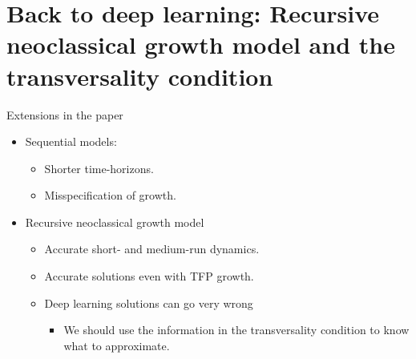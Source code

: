 \documentclass[aspectratio=169,10pt]{beamer}
\begin{document}
\section{\textcolor{PennBlue}{Back to deep learning: Recursive neoclassical growth model and the transversality condition }}

\begin{frame}{Extensions in the paper}
	\begin{itemize}
		\item Sequential models:
		\begin{itemize}
			\item Shorter time-horizons.
			\smallskip
			\item Misspecification of growth.\\
			\smallskip
		\end{itemize}
		\smallskip
		\item Recursive neoclassical growth model
		\begin{itemize}
			\item Accurate short- and medium-run dynamics.
			\smallskip
			\item Accurate solutions even with TFP growth.
			\smallskip
			\item Deep learning solutions can go very wrong
			\begin{itemize}
				\smallskip
				\item We should use the information in the transversality condition to know what to approximate.
			\end{itemize} 
		\end{itemize}
	\end{itemize}
\end{frame}
\end{document}
